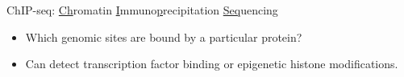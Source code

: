 \documentclass[10pt]{beamer}
\begin{document}
\begin{frame}{ChIP-seq: \underline{Ch}romatin \underline{I}mmuno\underline{p}recipitation \underline{Seq}uencing}
	\begin{minipage}{.46\linewidth}
		\begin{center}
			{}
		\end{center}
	\end{minipage}
	\begin{minipage}{.53\linewidth}
		\begin{itemize}
			\item Which genomic sites are bound by a particular protein?
			\item Can detect transcription factor binding or epigenetic histone modifications.

\end{itemize}
\end{minipage}
\end{frame}
\end{document}
